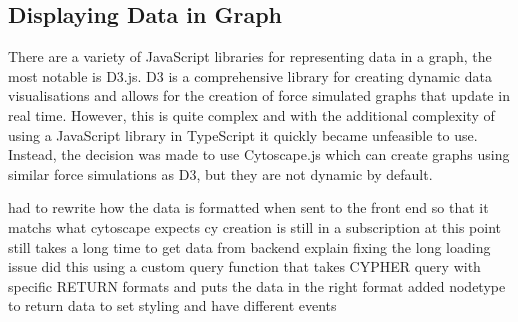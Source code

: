 \subsection{Displaying Data in Graph}
There are a variety of JavaScript libraries for representing data in a graph, the most notable is D3.js. D3 is a comprehensive library 
for creating dynamic data visualisations and allows for the creation of force simulated graphs that update in real time. However, this is 
quite complex and with the additional complexity of using a JavaScript library in TypeScript it quickly became unfeasible to use. 
Instead, the decision was made to use Cytoscape.js which can create graphs using similar force simulations as D3, but they are not 
dynamic by default.  

had to rewrite how the data is formatted when sent to the front end so that it matchs what cytoscape expects
cy creation is still in a subscription at this point
still takes a long time to get data from backend 
explain fixing the long loading issue
did this using a custom query function that takes CYPHER query with specific RETURN formats and puts the data in the right format
added nodetype to return data to set styling and have different events
